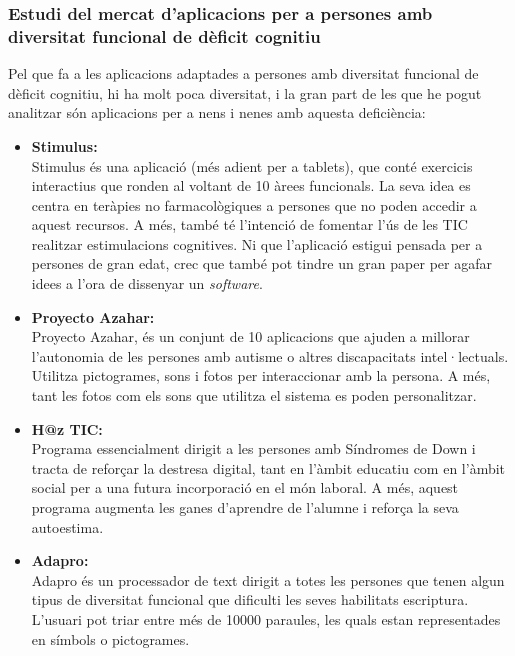 \documentclass[11pt,catalan,listoffigures,listoftables]{tfgetsinf}
\begin{document}
\subsubsection{Estudi del mercat d’aplicacions per a persones amb diversitat funcional de dèficit cognitiu}

Pel que fa a les aplicacions adaptades a persones amb diversitat funcional de dèficit cognitiu, hi ha molt poca diversitat, i la gran part de les que he pogut analitzar són aplicacions per a nens i nenes amb aquesta deficiència:

\begin{itemize}
	\item \textbf{Stimulus:}\\Stimulus és una aplicació (més adient per a tablets), que conté exercicis interactius que ronden al voltant de 10 àrees funcionals. La seva idea es centra en teràpies no farmacològiques a persones que no poden accedir a aquest recursos. A més, també té l’intenció de fomentar l’ús de les TIC realitzar estimulacions cognitives. Ni que l’aplicació estigui pensada per a persones de gran edat, crec que també pot tindre un gran paper per agafar idees a l’ora de dissenyar un \textit{software}.
	\item \textbf{Proyecto Azahar:}\\Proyecto Azahar, és un conjunt de 10 aplicacions que ajuden a millorar l’autonomia de les persones amb autisme o altres discapacitats intel·lectuals. Utilitza pictogrames, sons i fotos per interaccionar amb la persona. A més, tant les fotos com els sons que utilitza el sistema es poden personalitzar.
	\item \textbf{H@z TIC:}\\Programa essencialment dirigit a les persones amb Síndromes de Down i tracta de reforçar la destresa digital, tant en l’àmbit educatiu com en l’àmbit social per a una futura incorporació en el món laboral. A més, aquest programa augmenta les ganes d’aprendre de l’alumne i reforça la seva autoestima.
	\item \textbf{Adapro:}\\Adapro és un processador de text dirigit a totes les persones que tenen algun tipus de diversitat funcional que dificulti les seves habilitats escriptura. L’usuari pot triar entre més de 10000 paraules, les quals estan representades en símbols o pictogrames.
\end{itemize}
\end{document}

